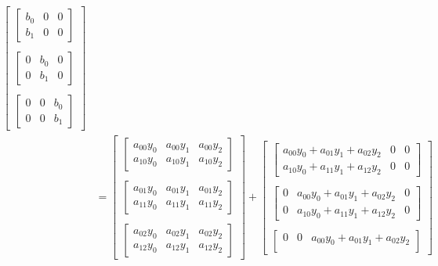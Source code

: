 \begin{align}
\begin{bmatrix}
\begin{bmatrix}
b_0 & 0 & 0 \\
b_1 & 0 & 0
\end{bmatrix} \\ \\
\begin{bmatrix}
0 & b_0 & 0\\
0 & b_1 & 0
\end{bmatrix} \\ \\
\begin{bmatrix}
0 & 0 & b_0\\
0 & 0 & b_1
\end{bmatrix}
\end{bmatrix} \nonumber \\
&=
\begin{bmatrix}
\begin{bmatrix}
a_{00} y_0 & a_{00} y_1 & a_{00} y_2 \\
a_{10} y_0 & a_{10} y_1 & a_{10} y_2
\end{bmatrix}\\ \\
%
\begin{bmatrix}
a_{01} y_0 & a_{01} y_1 & a_{01} y_2 \\
a_{11} y_0 & a_{11} y_1 & a_{11} y_2
\end{bmatrix}\\ \\
%
\begin{bmatrix}
a_{02} y_0 & a_{02} y_1 & a_{02} y_2 \\
a_{12} y_0 & a_{12} y_1 & a_{12} y_2
\end{bmatrix}
\end{bmatrix}
+
\begin{bmatrix}
\begin{bmatrix}
a_{00} y_0 + a_{01} y_1 + a_{02} y_2 & 0 & 0 \\
a_{10} y_0 + a_{11} y_1 + a_{12} y_2 & 0 & 0
\end{bmatrix}\\ \\
%
\begin{bmatrix}
0 & a_{00} y_0 + a_{01} y_1 + a_{02} y_2 & 0 \\
0 & a_{10} y_0 + a_{11} y_1 + a_{12} y_2 & 0
\end{bmatrix}\\ \\
%
\begin{bmatrix}
0 & 0 & a_{00} y_0 + a_{01} y_1 + a_{02} y_2 \\

\end{bmatrix}
\end{bmatrix}
\end{align}
